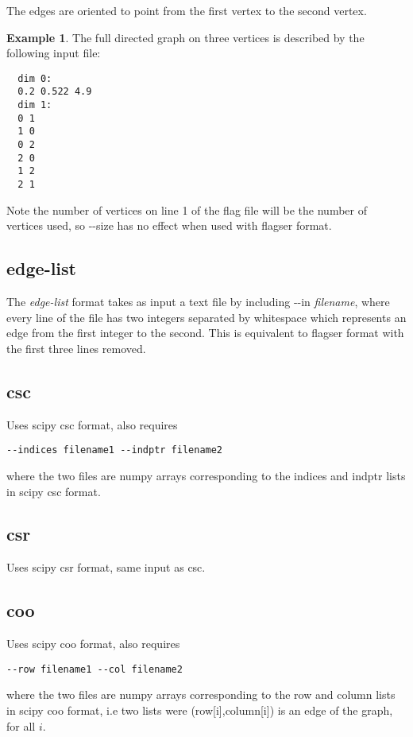 \documentclass{amsart}
\theoremstyle{definition}
\newtheorem*{example*}{Example}
\begin{document}
\noindent
The edges are oriented to point from the first vertex to the second vertex.

\begin{example*}
  The full directed graph on three vertices is described by the
  following input file:

  \vspace{.5em}
  \begin{verbatim}
  dim 0:
  0.2 0.522 4.9
  dim 1:
  0 1
  1 0
  0 2
  2 0
  1 2
  2 1
  \end{verbatim}
\end{example*}

Note the number of vertices on line 1 of the flag file will be the number of vertices used, so -{}-size has no effect when used with flagser format.

\subsection{edge-list}
The \textit{edge-list} format takes as input a text file by including -{}-in \textit{filename}, where every line of the file has two integers separated by whitespace which represents an edge from the first integer to the second. This is equivalent to flagser format with the first three lines removed.

\subsection{csc}
Uses scipy csc format, also requires
\begin{verbatim}--indices filename1 --indptr filename2\end{verbatim}
where the two files are numpy arrays corresponding to the indices and indptr lists in scipy csc format.

\subsection{csr}
Uses scipy csr format, same input as csc.

\subsection{coo}
Uses scipy coo format, also requires
\begin{verbatim}--row filename1 --col filename2\end{verbatim}
 where the two files are numpy arrays corresponding to the row and column lists in scipy coo format, i.e two lists were (row[i],column[i]) is an edge of the graph, for all $i$.
\end{document}
